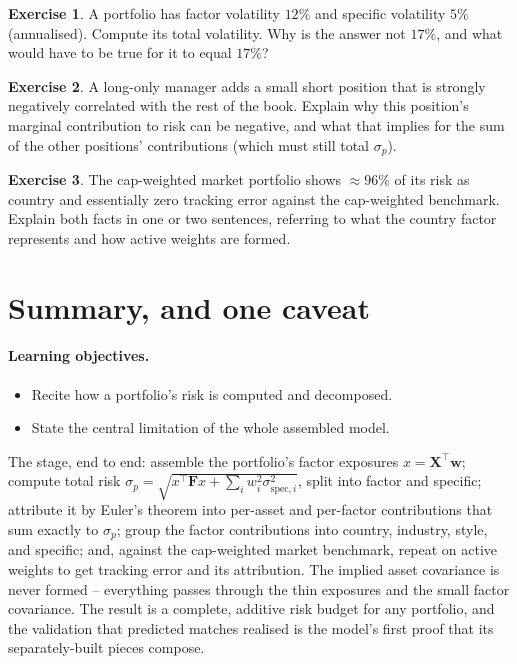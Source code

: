 \documentclass[11pt]{article}
\theoremstyle{definition}
\newtheorem{exercise}{Exercise}[section]
\theoremstyle{plain}
\theoremstyle{remark}
\newcommand{\T}{^{\!\top}}
\newcommand{\wvec}{\mathbf{w}}
\newcommand{\Xmat}{\mathbf{X}}
\newcommand{\Fmat}{\mathbf{F}}
\begin{document}
\begin{exercise}
A portfolio has factor volatility $12\%$ and specific volatility $5\%$ (annualised). Compute its total volatility. Why is the answer not $17\%$, and what would have to be true for it to equal $17\%$?
\end{exercise}

\begin{exercise}
A long-only manager adds a small short position that is strongly negatively correlated with the rest of the book. Explain why this position's marginal contribution to risk can be negative, and what that implies for the sum of the other positions' contributions (which must still total $\sigma_p$).
\end{exercise}

\begin{exercise}
The cap-weighted market portfolio shows $\approx 96\%$ of its risk as country and essentially zero tracking error against the cap-weighted benchmark. Explain both facts in one or two sentences, referring to what the country factor represents and how active weights are formed.
\end{exercise}

\section{Summary, and one caveat}\label{sec:summary}

\paragraph{Learning objectives.}
\begin{itemize}[leftmargin=1.4em,topsep=2pt]
  \item Recite how a portfolio's risk is computed and decomposed.
  \item State the central limitation of the whole assembled model.
\end{itemize}

The stage, end to end: assemble the portfolio's factor exposures $x=\Xmat\T\wvec$; compute total risk $\sigma_p=\sqrt{x\T\Fmat x + \sum_i w_i^2\sigma_{\text{spec},i}^2}$, split into factor and specific; attribute it by Euler's theorem into per-asset and per-factor contributions that sum exactly to $\sigma_p$; group the factor contributions into country, industry, style, and specific; and, against the cap-weighted market benchmark, repeat on active weights to get tracking error and its attribution. The implied asset covariance is never formed -- everything passes through the thin exposures and the small factor covariance. The result is a complete, additive risk budget for any portfolio, and the validation that predicted matches realised is the model's first proof that its separately-built pieces compose.
\end{document}
